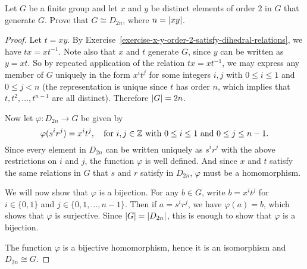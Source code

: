  Let $G$ be a finite group and let $x$ and $y$ be
distinct elements of order $2$ in $G$ that generate $G$. Prove that
$G\cong D_{2n}$, where $n = \lvert{xy}\rvert$.
\begin{proof}
  Let $t = xy$. By
  Exercise~\ref{exercise-x-y-order-2-satisfy-dihedral-relations}, we
  have $tx = xt^{-1}$. Note also that $x$ and $t$ generate $G$, since
  $y$ can be written as $y = xt$. So by repeated application of the
  relation $tx = xt^{-1}$, we may express any member of $G$ uniquely
  in the form $x^it^j$ for some integers $i,j$ with $0\leq i\leq1$ and
  $0\leq j<n$ (the representation is unique since $t$ has order $n$,
  which implies that $t, t^2, \dots, t^{n-1}$ are all
  distinct). Therefore $\lvert{G}\rvert = 2n$.

  Now let $\varphi\colon D_{2n}\to G$ be given by
  \begin{equation*}
    \varphi(s^ir^j) = x^it^j,
    \quad\text{for $i,j\in\mathbb{Z}$ with $0\leq i\leq1$ and $0\leq j\leq n-1$}.
  \end{equation*}
  Since every element in $D_{2n}$ can be written uniquely as $s^ir^j$
  with the above restrictions on $i$ and $j$, the function $\varphi$
  is well defined. And since $x$ and $t$ satisfy the same relations in
  $G$ that $s$ and $r$ satisfy in $D_{2n}$, $\varphi$ must be a
  homomorphism.

  We will now show that $\varphi$ is a bijection. For any $b\in G$,
  write $b = x^it^j$ for $i\in\{0,1\}$ and
  $j\in\{0,1,\dots,n-1\}$. Then if $a = s^ir^j$, we have
  $\varphi(a) = b$, which shows that $\varphi$ is surjective. Since
  $\lvert{G}\rvert = \lvert{D_{2n}}\rvert$, this is enough to show that $\varphi$ is a
  bijection.

  The function $\varphi$ is a bijective homomorphism, hence it is an
  isomorphism and $D_{2n}\cong G$.
\end{proof}

